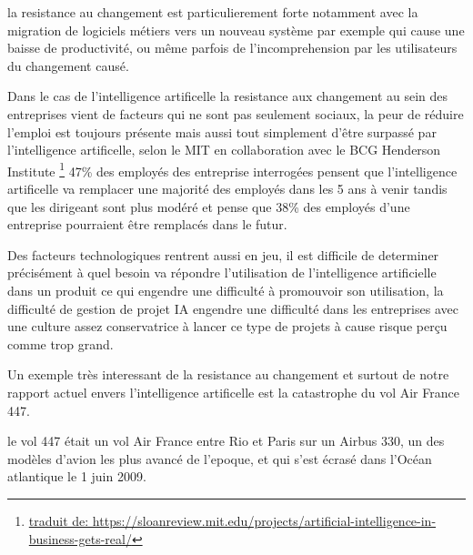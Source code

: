         la resistance au changement est particulierement forte notamment avec la  migration 
        de logiciels métiers vers un nouveau système par exemple qui cause une baisse de productivité,
        ou même parfois de l'incomprehension par les utilisateurs du changement causé. 
        \newline

        Dans le cas de l'intelligence artificelle la resistance aux changement au sein des entreprises
        vient de facteurs qui ne sont pas seulement sociaux, la peur de réduire l'emploi 
        est toujours présente mais aussi tout simplement d'être surpassé par l'intelligence
        artificelle, selon le MIT en collaboration avec le BCG Henderson Institute
        \footnote{\url{traduit de: https://sloanreview.mit.edu/projects/artificial-intelligence-in-business-gets-real/}}
        47\% des employés des entreprise interrogées
        pensent que l'intelligence artificelle va remplacer une majorité des employés 
        dans les 5 ans à venir tandis que les dirigeant sont plus modéré et pense 
        que 38\% des employés d'une entreprise pourraient être remplacés dans le futur. 
        \newline

        Des facteurs technologiques rentrent aussi en jeu, il est difficile de determiner 
        précisément à quel besoin va répondre l'utilisation de l'intelligence artificielle 
        dans un produit ce qui engendre une difficulté à promouvoir son utilisation, 
        la difficulté de gestion de projet IA engendre une difficulté dans les entreprises 
        avec une culture assez conservatrice à lancer ce type de projets à cause 
        risque perçu comme trop grand. 
        \newline

        Un exemple très interessant de la resistance au changement et surtout 
        de notre rapport actuel envers l'intelligence artificelle est la catastrophe 
        du vol Air France 447. 
        \newline 
        
        le vol 447 était un vol Air France entre Rio et Paris sur un Airbus 330, un des modèles 
        d'avion les plus avancé de l'epoque, et qui s'est écrasé dans l'Océan atlantique 
        le 1 juin 2009.

